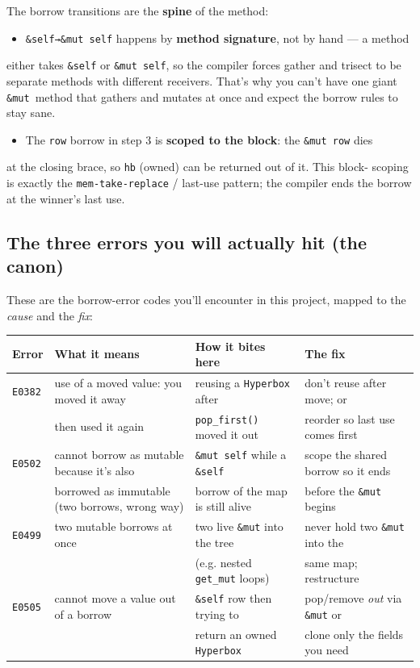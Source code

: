 \documentclass[11pt]{article}
\begin{document}
The borrow transitions are the \textbf{spine} of the method:

\begin{itemize}
\item \texttt{\&self→\&mut self} happens by \textbf{method signature}, not by hand — a method
\end{itemize}
either takes \texttt{\&self} or \texttt{\&mut self}, so the compiler forces gather and
trisect to be separate methods with different receivers. That's why you can't
have one giant \texttt{\&mut} method that gathers and mutates at once and expect the
borrow rules to stay sane.
\begin{itemize}
\item The \texttt{row} borrow in step 3 is \textbf{\textbf{scoped to the block}}: the \texttt{\&mut row} dies
\end{itemize}
at the closing brace, so \texttt{hb} (owned) can be returned out of it. This block-
scoping is exactly the \texttt{mem-take-replace} / last-use pattern; the compiler ends
the borrow at the winner's last use.
\subsection{The three errors you will actually hit (the canon)}
\label{sec:org835c550}

These are the borrow-error codes you'll encounter in this project, mapped to
the \emph{cause} and the \emph{fix}:

\begin{center}
\begin{tabular}{llll}
Error & What it means & How it bites here & The fix\\
\hline
\texttt{E0382} & use of a moved value: you moved it away & reusing a \texttt{Hyperbox} after & don't reuse after move; or\\
 & then used it again & \texttt{pop\_first()} moved it out & reorder so last use comes first\\
\texttt{E0502} & cannot borrow as mutable because it's also & \texttt{\&mut self} while a \texttt{\&self} & scope the shared borrow so it ends\\
 & borrowed as immutable (two borrows, wrong way) & borrow of the map is still alive & before the \texttt{\&mut} begins\\
\texttt{E0499} & two mutable borrows at once & two live \texttt{\&mut} into the tree & never hold two \texttt{\&mut} into the\\
 &  & (e.g. nested \texttt{get\_mut} loops) & same map; restructure\\
\texttt{E0505} & cannot move a value out of a borrow & \texttt{\&self} row then trying to & pop/remove \emph{out} via \texttt{\&mut} or\\
 &  & return an owned \texttt{Hyperbox} & clone only the fields you need\\
\end{tabular}
\end{center}
\end{document}
